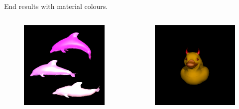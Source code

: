 \documentclass{beamer}
\begin{document}
\begin{frame}
	End results with material colours.
	\begin{columns}[T]
		\begin{column}{.45\textwidth}
			\begin{figure}
				\includegraphics[width=\textwidth]{dolphins2}
			\end{figure}
		\end{column}
		\begin{column}{.45\textwidth}
			\begin{figure}
				\includegraphics[width=\textwidth]{devilduk}
			\end{figure}
		\end{column}
	\end{columns}
\end{frame}
\end{document}
